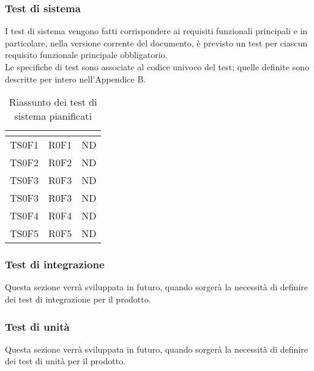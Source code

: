 \subsubsection{Test di sistema}
I test di sistema vengono fatti corrispondere ai requisiti funzionali principali e in particolare, nella versione corrente del documento, è previsto un test per ciascun requisito funzionale principale obbligatorio. \\
Le specifiche di test sono associate al codice univoco del test; quelle definite sono descritte per intero nell'Appendice B.
\renewcommand{\arraystretch}{1.5}
\begin{table}[H]
	\begin{center}
		\begin{tabular}{|c|c|c|}
			\hline
			\rowcolor{title_row}
			\textbf{\color{title_text}{Id Test}} & \textbf{\color{title_text}{Id Requisito}} & \textbf{\color{title_text}{Stato specifica}} \\
			\hline
			{TS0F1} & {R0F1} & {ND}\\
			\hline
			{TS0F2} & {R0F2} & {ND}\\
			\hline
			{TS0F3} & {R0F3} & {ND}\\
			\hline
			{TS0F3} & {R0F3} & {ND}\\
			\hline
			{TS0F4} & {R0F4} & {ND}\\
			\hline
			{TS0F5} & {R0F5} & {ND}\\
			\hline
		\end{tabular}
		\caption{Riassunto dei test di sistema pianificati}
		\label{tabella:riassunto ts}
	\end{center}
\end{table}
\renewcommand{\arraystretch}{1}
\subsubsection{Test di integrazione}
Questa sezione verrà sviluppata in futuro, quando sorgerà la necessità di definire dei test di integrazione per il prodotto.
\subsubsection{Test di unità}
Questa sezione verrà sviluppata in futuro, quando sorgerà la necessità di definire dei test di unità per il prodotto.



\pagebreak